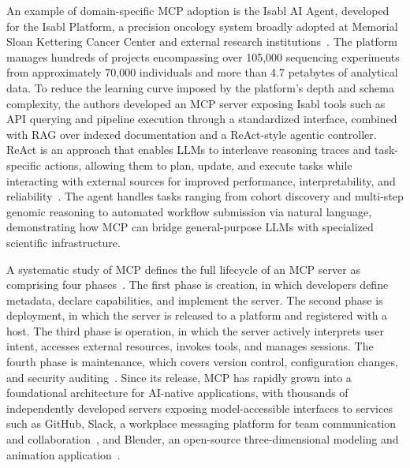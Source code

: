 \documentclass[
english,                 %
bibtex,                  %
]{kththesis}
\numberwithin{listing}{chapter}
\begin{document}
An example of domain-specific \gls{MCP} adoption is the Isabl \gls{AI} Agent, developed for the Isabl Platform, a precision oncology system broadly adopted at Memorial Sloan Kettering Cancer Center and external research institutions~\cite{arango_ossa_abstract_2026}. The platform manages hundreds of projects encompassing over 105,000 sequencing experiments from approximately 70,000 individuals and more than 4.7 petabytes of analytical data. To reduce the learning curve imposed by the platform's depth and schema complexity, the authors developed an \gls{MCP} server exposing Isabl tools such as \gls{API} querying and pipeline execution through a standardized interface, combined with \gls{RAG} over indexed documentation and a ReAct-style agentic controller. ReAct is an approach that enables \glspl{LLM} to interleave reasoning traces and task-specific actions, allowing them to plan, update, and execute tasks while interacting with external sources for improved performance, interpretability, and reliability~\cite{yao_react_2022}. The agent handles tasks ranging from cohort discovery and multi-step genomic reasoning to automated workflow submission via natural language, demonstrating how \gls{MCP} can bridge general-purpose \glspl{LLM} with specialized scientific infrastructure.

A systematic study of \gls{MCP} defines the full lifecycle of an \gls{MCP} server as comprising four phases~\cite{hou_model_2026}. The first phase is creation, in which developers define metadata, declare capabilities, and implement the server. The second phase is deployment, in which the server is released to a platform and registered with a host. The third phase is operation, in which the server actively interprets user intent, accesses external resources, invokes tools, and manages sessions. The fourth phase is maintenance, which covers version control, configuration changes, and security auditing~\cite{hou_model_2026}. Since its release, \gls{MCP} has rapidly grown into a foundational architecture for \gls{AI}-native applications, with thousands of independently developed servers exposing model-accessible interfaces to services such as GitHub, Slack, a workplace messaging platform for team communication and collaboration~\cite{slack_technologies_llc_a_salesforce_company_slack_2026}, and Blender, an open-source three-dimensional modeling and animation application~\cite{blender_foundation_blender_2026}.
\end{document}
